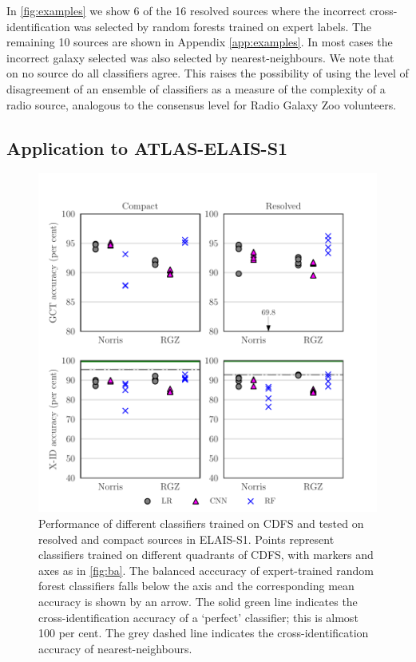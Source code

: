 \documentclass[fleqn,usenatbib,usedcolumn]{mnras}
\begin{document}
    In \autoref{fig:examples} we show 6 of the 16 resolved sources where the incorrect cross-identification was selected by random forests trained on expert labels. The remaining 10 sources are shown in Appendix \autoref{app:examples}. In most cases the incorrect galaxy selected was also selected by nearest-neighbours. We note that on no source do all classifiers agree. This raises the possibility of using the level of disagreement of an ensemble of classifiers as a measure of the complexity of a radio source, analogous to the consensus level for Radio Galaxy Zoo volunteers.

\subsection{Application to ATLAS-ELAIS-S1}
  \label{sec:elais}

  \begin{figure}
  \centering
  \includegraphics[width=\columnwidth]{images/elais-grid-new.pdf}
  \caption{Performance of different classifiers trained on CDFS and tested on resolved and compact sources in ELAIS-S1. Points represent classifiers trained on different quadrants of CDFS, with markers and axes as in \autoref{fig:ba}. The balanced acccuracy of expert-trained random forest classifiers falls below the axis and the corresponding mean accuracy is shown by an arrow. The solid green line indicates the cross-identification accuracy of a `perfect' classifier; this is almost 100 per cent. The grey dashed line indicates the cross-identification accuracy of nearest-neighbours.
    \label{fig:elais-ba}}
  \end{figure}
\end{document}

